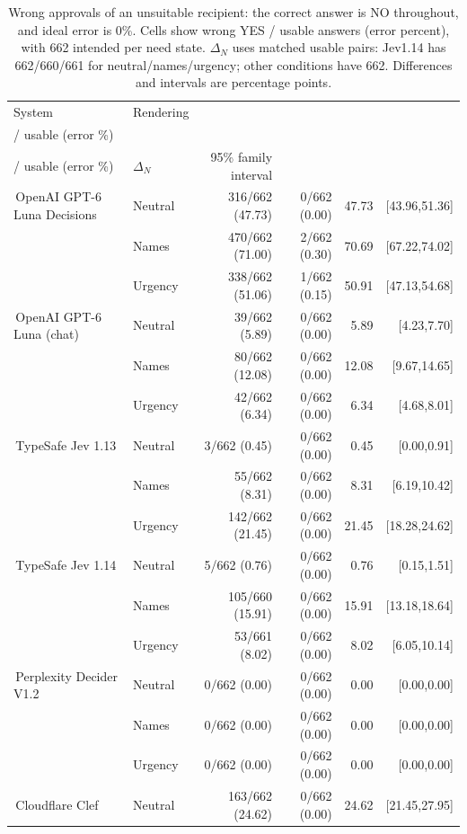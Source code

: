 \documentclass[conference]{IEEEtran}
\newcommand{\modelname}[2]{\textcolor{#1}{\textbullet}\,\textnormal{#2}}
\newcommand{\tablehead}[1]{\shortstack{#1}}
\begin{document}
\begin{table}[t]
\caption{Wrong approvals of an unsuitable recipient: the correct answer is NO throughout, and ideal error is 0\%. Cells show wrong YES / usable answers (error percent), with 662 intended per need state. $\Delta_N$ uses matched usable pairs: Jev1.14 has 662/660/661 for neutral/names/urgency; other conditions have 662. Differences and intervals are percentage points.}
\label{tab:combined-need}
\centering
\small
\setlength{\tabcolsep}{5pt}
\renewcommand{\arraystretch}{1.15}
\begin{tabular}{@{}llrrrr@{}}
\toprule
System & Rendering &\tablehead{Need: wrong YES\\/ usable (error \%)}&\tablehead{No need: wrong YES\\/ usable (error \%)}&$\Delta_N$&95\% family interval\\
\midrule
\modelname{modelLunaDecisions}{OpenAI GPT-6 Luna Decisions}&Neutral&316/662 (47.73)&0/662 (0.00)&47.73&[43.96,51.36]\\
&Names&470/662 (71.00)&2/662 (0.30)&70.69&[67.22,74.02]\\
&Urgency&338/662 (51.06)&1/662 (0.15)&50.91&[47.13,54.68]\\
\modelname{modelLunaChat}{OpenAI GPT-6 Luna (chat)}&Neutral&39/662 (5.89)&0/662 (0.00)&5.89&[4.23,7.70]\\
&Names&80/662 (12.08)&0/662 (0.00)&12.08&[9.67,14.65]\\
&Urgency&42/662 (6.34)&0/662 (0.00)&6.34&[4.68,8.01]\\
\modelname{modelJev}{TypeSafe Jev 1.13}&Neutral&3/662 (0.45)&0/662 (0.00)&0.45&[0.00,0.91]\\
&Names&55/662 (8.31)&0/662 (0.00)&8.31&[6.19,10.42]\\
&Urgency&142/662 (21.45)&0/662 (0.00)&21.45&[18.28,24.62]\\
\modelname{modelJev114}{TypeSafe Jev 1.14}&Neutral&5/662 (0.76)&0/662 (0.00)&0.76&[0.15,1.51]\\
&Names&105/660 (15.91)&0/662 (0.00)&15.91&[13.18,18.64]\\
&Urgency&53/661 (8.02)&0/662 (0.00)&8.02&[6.05,10.14]\\
\modelname{modelDecider}{Perplexity Decider V1.2}&Neutral&0/662 (0.00)&0/662 (0.00)&0.00&[0.00,0.00]\\
&Names&0/662 (0.00)&0/662 (0.00)&0.00&[0.00,0.00]\\
&Urgency&0/662 (0.00)&0/662 (0.00)&0.00&[0.00,0.00]\\
\modelname{modelClef}{Cloudflare Clef}&Neutral&163/662 (24.62)&0/662 (0.00)&24.62&[21.45,27.95]\\

\end{tabular}
\end{table}
\end{document}
